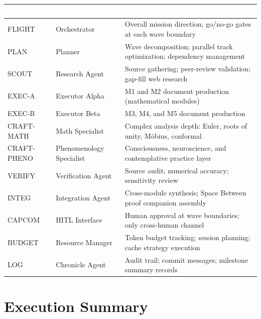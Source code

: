 \documentclass[11pt,letterpaper]{article}
\newcommand{\tableheader}[1]{\textbf{\sffamily\textcolor{white}{#1}}}
\begin{document}
\begin{center}
\begin{tabularx}{\textwidth}{L{2.2cm}L{2.8cm}X}
\toprule
{}
\tableheader{Role} & \tableheader{Agent} & \tableheader{Responsibility} \\
\midrule
FLIGHT & Orchestrator & Overall mission direction; go/no-go gates at each wave boundary \\
PLAN & Planner & Wave decomposition; parallel track optimization; dependency management \\
SCOUT & Research Agent & Source gathering; peer-review validation; gap-fill web research \\
EXEC-A & Executor Alpha & M1 and M2 document production (mathematical modules) \\
EXEC-B & Executor Beta & M3, M4, and M5 document production \\
CRAFT-MATH & Math Specialist & Complex analysis depth: Euler, roots of unity, M\"{o}bius, conformal \\
CRAFT-PHENO & Phenomenology Specialist & Consciousness, neuroscience, and contemplative practice layer \\
VERIFY & Verification Agent & Source audit; numerical accuracy; sensitivity review \\
INTEG & Integration Agent & Cross-module synthesis; Space Between proof companion assembly \\
CAPCOM & HITL Interface & Human approval at wave boundaries; only cross-human channel \\
BUDGET & Resource Manager & Token budget tracking; session planning; cache strategy execution \\
LOG & Chronicle Agent & Audit trail; commit messages; milestone summary records \\
\bottomrule
\end{tabularx}
\end{center}

\section{Execution Summary}
\end{document}
